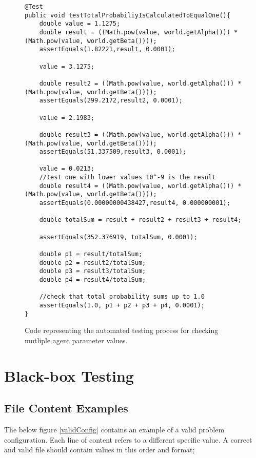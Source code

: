 \begin{figure}[H]
\begin{lstlisting}
@Test
public void testTotalProbabiliyIsCalculatedToEqualOne(){
	double value = 1.1275;
	double result = ((Math.pow(value, world.getAlpha())) * (Math.pow(value, world.getBeta())));
	assertEquals(1.82221,result, 0.0001);

	value = 3.1275;

	double result2 = ((Math.pow(value, world.getAlpha())) * (Math.pow(value, world.getBeta())));
	assertEquals(299.2172,result2, 0.0001);

	value = 2.1983;

	double result3 = ((Math.pow(value, world.getAlpha())) * (Math.pow(value, world.getBeta())));
	assertEquals(51.337509,result3, 0.0001);

	value = 0.0213;
	//test one with lower values 10^-9 is the result
	double result4 = ((Math.pow(value, world.getAlpha())) * (Math.pow(value, world.getBeta())));
	assertEquals(0.00000000438427,result4, 0.000000001);

	double totalSum = result + result2 + result3 + result4;

	assertEquals(352.376919, totalSum, 0.0001);

	double p1 = result/totalSum;
	double p2 = result2/totalSum;
	double p3 = result3/totalSum;
	double p4 = result4/totalSum;

	//check that total probability sums up to 1.0
	assertEquals(1.0, p1 + p2 + p3 + p4, 0.0001);
}
\end{lstlisting}
\caption{Code representing the automated testing process for checking mutliple agent parameter values.}
\label{testProb}
\end{figure}

\section{Black-box Testing}
\subsection{File Content Examples}
\label{fileIOtest}

The below figure \ref{validConfig} contains an example of a valid problem configuration. Each line of content refers to a different specific value. A correct and valid file should contain values in this order and format;

